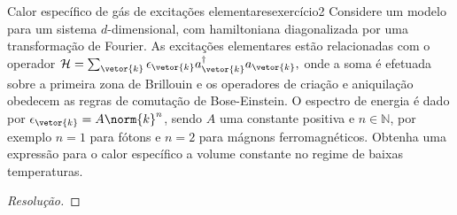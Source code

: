\begin{exercício}{Calor específico de gás de excitações elementares}{exercício2}
    Considere um modelo para um sistema \(d\)-dimensional, com hamiltoniana diagonalizada por uma transformação de Fourier. As excitações elementares estão relacionadas com o operador \(\mathcal{H} = \sum_{\vetor{k}} \epsilon_{\vetor{k}} a_{\vetor{k}}^\dag a_{\vetor{k}},\) onde a soma é efetuada sobre a primeira zona de Brillouin e os operadores de criação e aniquilação obedecem as regras de comutação de Bose-Einstein. O espectro de energia é dado por \(\epsilon_{\vetor{k}} = A\norm{k}^n\), sendo \(A\) uma constante positiva e \(n \in \mathbb{N}\), por exemplo \(n = 1\) para fótons e \(n = 2\) para mágnons ferromagnéticos. Obtenha uma expressão para o calor específico a volume constante no regime de baixas temperaturas.
\end{exercício}
\begin{proof}[Resolução]

\end{proof}

